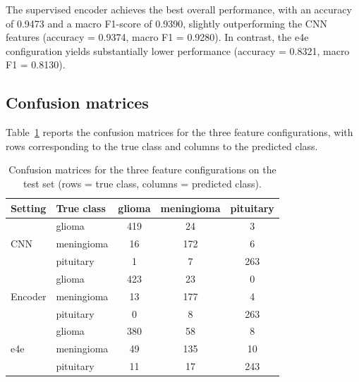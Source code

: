 The supervised encoder achieves the best overall performance, with an accuracy of 0.9473 and a macro F1-score of 0.9390, slightly outperforming the CNN features (accuracy = 0.9374, macro F1 = 0.9280). In contrast, the e4e configuration yields substantially lower performance (accuracy = 0.8321, macro F1 = 0.8130).


\subsection{Confusion matrices}

Table~\ref{tab:cm_all_models} reports the confusion matrices for the three feature configurations, with rows corresponding to the true class and columns to the predicted class.

\begin{table}[ht]
    \centering
    \caption{Confusion matrices for the three feature configurations on the test set (rows = true class, columns = predicted class).}
    \label{tab:cm_all_models}
    \begin{tabular}{llccc}
        \toprule
        Setting        & True class & glioma & meningioma & pituitary \\
        \midrule
        \multirow{3}{*}{CNN}
                       & glioma      & 419   & 24        & 3         \\
                       & meningioma  & 16    & 172       & 6         \\
                       & pituitary   & 1     & 7         & 263       \\
        \midrule
        \multirow{3}{*}{Encoder}
                       & glioma      & 423   & 23        & 0         \\
                       & meningioma  & 13    & 177       & 4         \\
                       & pituitary   & 0     & 8         & 263       \\
        \midrule
        \multirow{3}{*}{e4e}
                       & glioma      & 380   & 58        & 8         \\
                       & meningioma  & 49    & 135       & 10        \\
                       & pituitary   & 11    & 17        & 243       \\
        \bottomrule
    \end{tabular}
\end{table}

